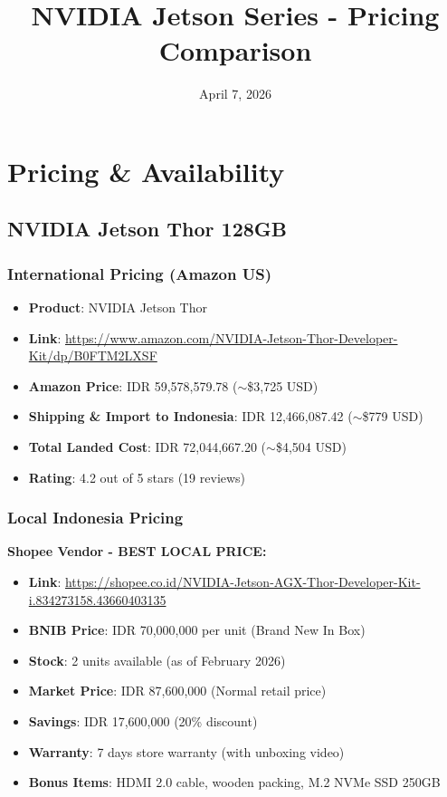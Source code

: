 \documentclass[12pt,a4paper]{article}
\title{NVIDIA Jetson Series - Pricing Comparison}
\author{}
\date{April 7, 2026}
\begin{document}
\maketitle

\section{Pricing \& Availability}

\subsection{NVIDIA Jetson Thor 128GB}

\subsubsection*{International Pricing (Amazon US)}
\begin{itemize}
    \item \textbf{Product}: NVIDIA Jetson Thor
    \item \textbf{Link}: \url{https://www.amazon.com/NVIDIA-Jetson-Thor-Developer-Kit/dp/B0FTM2LXSF}
    \item \textbf{Amazon Price}: IDR 59,578,579.78 ($\sim$\$3,725 USD)
    \item \textbf{Shipping \& Import to Indonesia}: IDR 12,466,087.42 ($\sim$\$779 USD)
    \item \textbf{Total Landed Cost}: IDR 72,044,667.20 ($\sim$\$4,504 USD)
    \item \textbf{Rating}: 4.2 out of 5 stars (19 reviews)
\end{itemize}

\subsubsection*{Local Indonesia Pricing}

\textbf{Shopee Vendor - BEST LOCAL PRICE:}
\begin{itemize}
    \item \textbf{Link}: \url{https://shopee.co.id/NVIDIA-Jetson-AGX-Thor-Developer-Kit-i.834273158.43660403135}
    \item \textbf{BNIB Price}: IDR 70,000,000 per unit (Brand New In Box)
    \item \textbf{Stock}: 2 units available (as of February 2026)
    \item \textbf{Market Price}: IDR 87,600,000 (Normal retail price)
    \item \textbf{Savings}: IDR 17,600,000 (20\% discount)
    \item \textbf{Warranty}: 7 days store warranty (with unboxing video)
    \item \textbf{Bonus Items}: HDMI 2.0 cable, wooden packing, M.2 NVMe SSD 250GB
\end{itemize}
\end{document}
